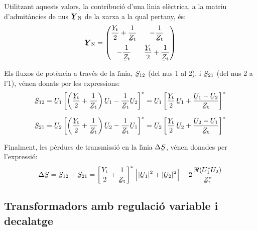 Utilitzant aquests valors, la contribuci\'{o} d'una l\'{\i}nia el\`{e}ctrica, a
la matriu d'admit\`{a}ncies de nus $\mcmplx{Y}\ped{N}$ de la xarxa a la
qual pertany, \'{e}s: 
\begin{equation}
   \mcmplx{Y}\ped{N} = \begin{pmatrix}
     \dfrac{\cmplx{Y}\ped{t}}{2} + \dfrac{1}{\cmplx{Z}\ped{t}} & -\dfrac{1}{\cmplx{Z}\ped{t}}\\[2.5ex]
     -\dfrac{1}{\cmplx{Z}\ped{t}} & \dfrac{\cmplx{Y}\ped{t}}{2} + \dfrac{1}{\cmplx{Z}\ped{t}}
   \end{pmatrix}
\end{equation}

Els fluxos de pot\`{e}ncia a trav\'{e}s de la l\'{\i}nia, $\cmplx{S}_{12}$ (del
nus 1 al 2), i $\cmplx{S}_{21}$ (del nus 2 a l'1), v\'{e}nen donats per
les expressions:
\begin{align}
   \cmplx{S}_{12} &= \cmplx{U}_1 \left[ \left( \frac{\cmplx{Y}\ped{t}}{2} + \frac{1}{\cmplx{Z}\ped{t}} \right) \cmplx{U}_1 - \frac{1}{\cmplx{Z}\ped{t}} \cmplx{U}_2 \right]^* = \cmplx{U}_1 \left[ \frac{\cmplx{Y}\ped{t}}{2}\, \cmplx{U}_1 + \frac{\cmplx{U}_1 - \cmplx{U}_2}{\cmplx{Z}\ped{t}} \right]^* \label{eq:lin_s12}
   \\[1.5ex]
   \cmplx{S}_{21} &= \cmplx{U}_2 \left[ \left( \frac{\cmplx{Y}\ped{t}}{2} + \frac{1}{\cmplx{Z}\ped{t}} \right) \cmplx{U}_2 - \frac{1}{\cmplx{Z}\ped{t}} \cmplx{U}_1 \right]^* = \cmplx{U}_2 \left[ \frac{\cmplx{Y}\ped{t}}{2} \,\cmplx{U}_2 + \frac{\cmplx{U}_2 - \cmplx{U}_1}{\cmplx{Z}\ped{t}} \right]^* \label{eq:lin_s21}
\end{align}

Finalment, les p\`{e}rdues de transmissi\'{o} en la  l\'{\i}nia
$\Delta\cmplx{S}$, v\'{e}nen donades per
l'expressi\'{o}:
\begin{equation}
   \Delta\cmplx{S} = \cmplx{S}_{12} + \cmplx{S}_{21} = \left[ \frac{\cmplx{Y}\ped{t}}{2} + \frac{1}{\cmplx{Z}\ped{t}} \right]^* \Big[ |\cmplx{U}_1|^2 + |\cmplx{U}_2|^2 \Big] - 2 \, \frac{\Re (\cmplx{U}_1^* \cmplx{U}_2)}{\cmplx{Z}\ped{t}^*}
\end{equation}

\subsection{Transformadors amb regulaci\'{o} variable i decalatge}

